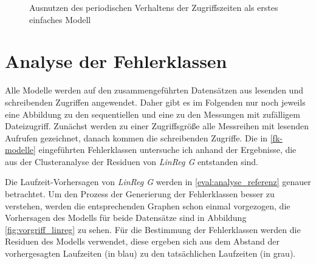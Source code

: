 \documentclass[
	twoside,
	12pt,
	a4paper,
	BCOR10mm,
	DIV14,
	listof=totoc,
	bibliography=totoc,
	headsepline
]{scrreprt}
\begin{document}
\begin{figure}
	\begin{center}
		\caption{Ausnutzen des periodischen Verhaltens der Zugriffszeiten als erstes einfaches Modell}
		\label{fig:periodicity100001}
	\end{center}
\end{figure} 
\clearpage

\section{Analyse der Fehlerklassen}
\label{eval:fk_analyse}
Alle Modelle werden auf den zusammengeführten Datensätzen aus lesenden und schreibenden Zugriffen angewendet. Daher gibt es im Folgenden nur noch jeweils eine Abbildung zu den sequentiellen und eine zu den Messungen mit zufälligem Dateizugriff.
Zunächst werden zu einer Zugriffsgröße alle Messreihen mit lesenden Aufrufen gezeichnet, danach kommen die schreibenden Zugriffe. 
Die in \ref{fk-modelle} eingeführten Fehlerklassen untersuche ich anhand der Ergebnisse, die aus der Clusteranalyse der Residuen von \textit{LinReg G} entstanden sind.\medskip

Die Laufzeit-Vorhersagen von \textit{LinReg G} werden in \ref{eval:analyse_referenz} genauer betrachtet.
Um den Prozess der Generierung der Fehlerklassen besser zu verstehen, werden die entsprechenden Graphen schon einmal vorgezogen, die Vorhersagen des Modells für beide Datensätze sind in Abbildung \ref{fig:vorgriff_linreg} zu sehen.
Für die Bestimmung der Fehlerklassen werden die Residuen des Modells verwendet, diese ergeben sich aus dem Abstand der vorhergesagten Laufzeiten (in blau) zu den tatsächlichen Laufzeiten (in grau). 
\end{document}
